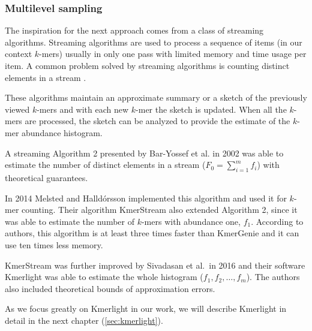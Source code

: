 \subsubsection{Multilevel sampling}
The inspiration for the next approach comes from a class of streaming algorithms.
Streaming algorithms are used to process a sequence of items (in our context $k$-mers) usually 
in only one pass with limited memory and time usage per item. A common problem solved by
streaming algorithms is counting distinct elements in a stream \cite{WikiStreamingAlg}.

These algorithms maintain an approximate summary or a sketch of the previously viewed
$k$-mers and with each new $k$-mer the sketch is updated. When all the $k$-mers are processed,
the sketch can be analyzed to provide the estimate of the $k$-mer abundance histogram.

\medskip

A streaming Algorithm 2 presented by Bar-Yossef et al. in 2002 \cite{Bar-Yossef2002} was
able to estimate the number of distinct elements in a stream ($F_0 = \sum_{i=1}^{m} f_i$)
with theoretical guarantees. 

In 2014 Melsted and Halldórsson \cite{Melsted2014} implemented this algorithm and used it for
$k$-mer counting. Their algorithm KmerStream also extended Algorithm 2, since it was able
to estimate the number of $k$-mers with abundance one, $f_1$. According to authors, this
algorithm is at least three times faster than KmerGenie and it can use ten times less memory.

KmerStream was further improved by Sivadasan et al.\ in 2016 \cite{Sivadasan2016}
and their software Kmerlight was able to estimate the whole histogram ($f_1, f_2, \dots , f_m$).
The authors also included theoretical bounds of approximation errors.

As we focus greatly on Kmerlight in our work, we will describe Kmerlight in detail 
in the next chapter (\ref{sec:kmerlight}).
